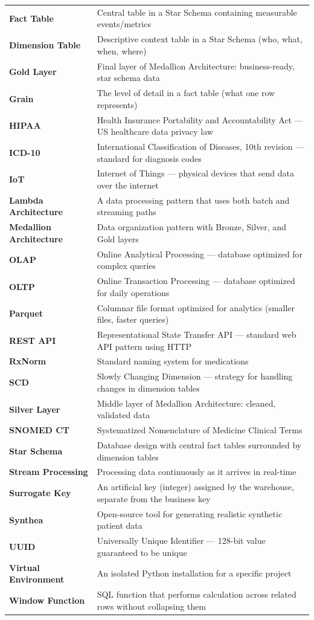 \documentclass[12pt, a4paper, oneside]{report}
\begin{document}
\begin{longtable}{>{\bfseries}p{4cm} p{9.5cm}}
    Fact Table & Central table in a Star Schema containing measurable events/metrics \\
    Dimension Table & Descriptive context table in a Star Schema (who, what, when, where) \\
    Gold Layer & Final layer of Medallion Architecture: business-ready, star schema data \\
    Grain & The level of detail in a fact table (what one row represents) \\
    HIPAA & Health Insurance Portability and Accountability Act --- US healthcare data privacy law \\
    ICD-10 & International Classification of Diseases, 10th revision --- standard for diagnosis codes \\
    IoT & Internet of Things --- physical devices that send data over the internet \\
    Lambda Architecture & A data processing pattern that uses both batch and streaming paths \\
    Medallion Architecture & Data organization pattern with Bronze, Silver, and Gold layers \\
    OLAP & Online Analytical Processing --- database optimized for complex queries \\
    OLTP & Online Transaction Processing --- database optimized for daily operations \\
    Parquet & Columnar file format optimized for analytics (smaller files, faster queries) \\
    REST API & Representational State Transfer API --- standard web API pattern using HTTP \\
    RxNorm & Standard naming system for medications \\
    SCD & Slowly Changing Dimension --- strategy for handling changes in dimension tables \\
    Silver Layer & Middle layer of Medallion Architecture: cleaned, validated data \\
    SNOMED CT & Systematized Nomenclature of Medicine Clinical Terms \\
    Star Schema & Database design with central fact tables surrounded by dimension tables \\
    Stream Processing & Processing data continuously as it arrives in real-time \\
    Surrogate Key & An artificial key (integer) assigned by the warehouse, separate from the business key \\
    Synthea & Open-source tool for generating realistic synthetic patient data \\
    UUID & Universally Unique Identifier --- 128-bit value guaranteed to be unique \\
    Virtual Environment & An isolated Python installation for a specific project \\
    Window Function & SQL function that performs calculation across related rows without collapsing them \\
    \bottomrule
\end{longtable}
\end{document}
